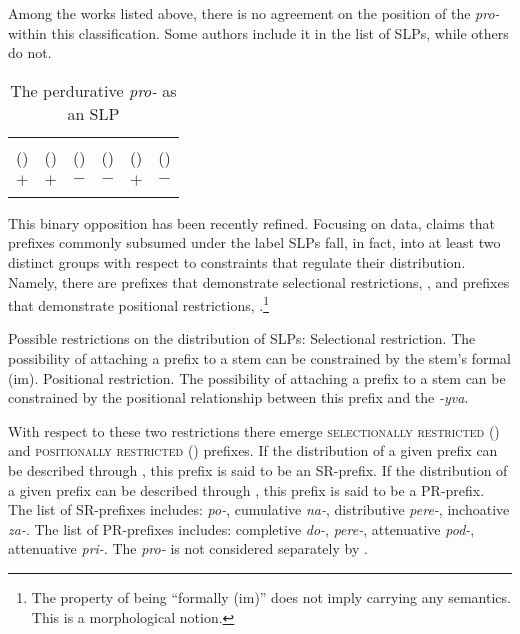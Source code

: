 \documentclass[output=paper,colorlinks,citecolor=brown,newtxmath]{langsci/langscibook}
\begin{document}
\noindent Among the works listed above, there is no agreement on the position of the  \textit{pro-} within this classification. Some authors include it in the list of SLPs, while others do not.


\begin{table}[h!]
\caption{The perdurative \textit{pro-} as an SLP}
\small
\label{tab1}
\begin{tabularx}{\textwidth}{cCCCCC}
  \lsptoprule
            \citeauthor{babko1999zero}  &	\citeauthor{ramchand2005time} &	\citeauthor{svenonius2004slavic}  &	\citeauthor{romanova2007constructing}  &	\citeauthor{gehrke2008ps}  &	\citeauthor{tolskaya2015verbal}\\
            (\citeyear{babko1999zero}) & (\citeyear{ramchand2005time}) & (\citeyear{svenonius2004slavic}) & (\citeyear{romanova2007constructing}) & (\citeyear{gehrke2008ps}) & (\citeyear{tolskaya2015verbal}) \\
  \midrule
 $+$ &    $+$  &    $-$ & $-$ & $+$ & $-$\\
  \lspbottomrule
 \end{tabularx}
\end{table}

This binary opposition has been recently refined. Focusing on  data, \citet{tatevosov2009mnozestvennaja,tatevosov2013mnozestvennaja} claims that prefixes commonly subsumed under the label SLPs fall, in fact, into at least two distinct groups with respect to constraints that regulate their distribution. Namely, there are prefixes that demonstrate selectional restrictions, , and prefixes that demonstrate positional restrictions, .\footnote{ The property of being ``formally (im)'' does not imply carrying any  semantics. This is a morphological notion.}


\ea \label{ex:naumov:6} Possible restrictions on the distribution of SLPs:
\ea \label{ex:naumov:6a} Selectional restriction. The possibility of attaching a prefix to a stem can be constrained by the stem's formal (im).
\ex \label{ex:naumov:6b} Positional restriction. The possibility of attaching a prefix to a stem can be constrained by the positional relationship between this prefix and the  \textit{-yva}.
\z \z

\noindent With respect to these two restrictions there emerge \textsc{selectionally restricted} () and \textsc{positionally restricted} () prefixes. If the distribution of a given prefix can be described through , this prefix is said to be an SR-prefix. If the distribution of a given prefix can be described through , this prefix is said to be a PR-prefix. The list of SR-prefixes includes:  \textit{po-}, cumulative \mbox{\textit{na-},} distributive \textit{pere-}, inchoative \textit{za-}. The list of PR-prefixes includes: completive \mbox{\textit{do-},}  \textit{pere-}, attenuative \textit{pod-}, attenuative \textit{pri-}. The  \textit{pro-} is not considered separately by \citet{tatevosov2009mnozestvennaja, tatevosov2013mnozestvennaja}.
\end{document}
